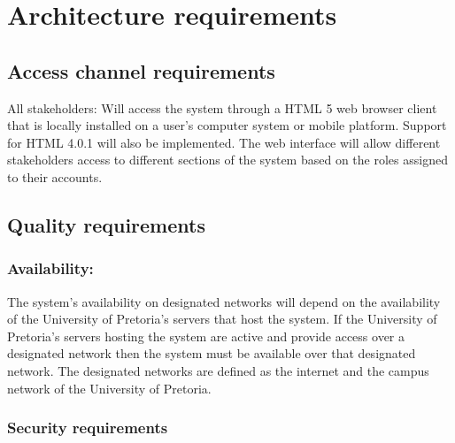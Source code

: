 \documentclass[12pt]{article}
\begin{document}
	\newpage
	\section{Architecture requirements}
		\subsection{Access channel requirements} %
		\vspace{0.2in}
		All stakeholders: Will access the system through a HTML 5 web browser client that is locally installed on a user's computer system or mobile platform. Support for HTML 4.0.1 will also be implemented. The web interface will allow different stakeholders access to different sections of the system based on the roles assigned to their accounts.   

		\vspace{0.2in}
		
		\subsection{Quality requirements} %
		\vspace{0.2in}
		
		\subsubsection{Availability:}
				
		\begin{flushleft}
		
		The system's availability on designated networks will depend on the availability of the University of Pretoria's servers that host the system. If the University of Pretoria's servers hosting the system are active and provide access over a designated network then the system must be available over that designated network. The designated networks are defined as the internet and the campus network of the University of Pretoria.
		
		\end{flushleft}
		
		\vspace{0.1in}
				
		\subsubsection{Security requirements}
		
\end{document}
